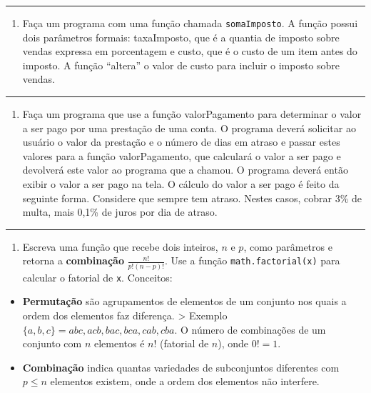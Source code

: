 \documentclass[12pt,a4paper]{article}
\renewcommand{\linethickness}{0.05em}
\providecommand{\tightlist}{%
      \setlength{\itemsep}{0pt}\setlength{\parskip}{0pt}}
\begin{document}
    \begin{center}\rule{0.5\linewidth}{\linethickness}\end{center}

\begin{enumerate}
\def\labelenumi{\arabic{enumi}.}
\setcounter{enumi}{1}
\tightlist
\item
  Faça um programa com uma função chamada \texttt{somaImposto}. A função
  possui dois parâmetros formais: taxaImposto, que é a quantia de
  imposto sobre vendas expressa em porcentagem e custo, que é o custo de
  um item antes do imposto. A função ``altera'' o valor de custo para
  incluir o imposto sobre vendas.
\end{enumerate}

    \begin{center}\rule{0.5\linewidth}{\linethickness}\end{center}

\begin{enumerate}
\def\labelenumi{\arabic{enumi}.}
\setcounter{enumi}{2}
\tightlist
\item
  Faça um programa que use a função valorPagamento para determinar o
  valor a ser pago por uma prestação de uma conta. O programa deverá
  solicitar ao usuário o valor da prestação e o número de dias em atraso
  e passar estes valores para a função valorPagamento, que calculará o
  valor a ser pago e devolverá este valor ao programa que a chamou. O
  programa deverá então exibir o valor a ser pago na tela. O cálculo do
  valor a ser pago é feito da seguinte forma. Considere que sempre tem
  atraso. Nestes casos, cobrar 3\% de multa, mais 0,1\% de juros por dia
  de atraso.
\end{enumerate}

    \begin{center}\rule{0.5\linewidth}{\linethickness}\end{center}

\begin{enumerate}
\def\labelenumi{\arabic{enumi}.}
\setcounter{enumi}{3}
\tightlist
\item
  Escreva uma função que recebe dois inteiros, \(n\) e \(p\), como
  parâmetros e retorna a \textbf{combinação} \(\frac{n!}{p!(n-p)!}\).
  Use a função \texttt{math.factorial(x)} para calcular o fatorial de
  \texttt{x}. Conceitos:
\end{enumerate}

\begin{itemize}
\tightlist
\item
  \textbf{Permutação} são agrupamentos de elementos de um conjunto nos
  quais a ordem dos elementos faz diferença. \textgreater{} Exemplo
  \(\{a,b,c\} = abc, acb, bac, bca, cab, cba\). O número de combinações
  de um conjunto com \(n\) elementos é \(n!\) (fatorial de \(n\)), onde
  \(0! = 1\).
\item
  \textbf{Combinação} indica quantas variedades de subconjuntos
  diferentes com \(p\leq n\) elementos existem, onde a ordem dos
  elementos não interfere.
\end{itemize}
\end{document}
